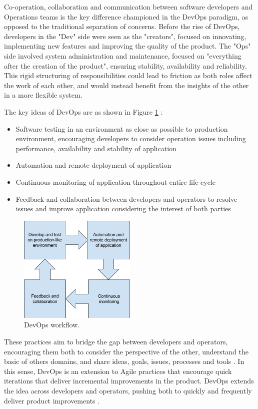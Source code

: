Co-operation, collaboration and communication between software developers and Operations teams is the key difference championed in the DevOps paradigm, as opposed to the traditional separation of concerns. Before the rise of DevOps, developers in the "Dev" side were seen as the "creators", focused on innovating, implementing new features and improving the quality of the product. The "Ops" side involved system administration and maintenance, focused on "everything after the creation of the product", ensuring stability, availability and reliability. This rigid structuring of responsibilities could lead to friction as both roles affect the work of each other, and would instead benefit from the insights of the other in a more flexible system. 

The key ideas of DevOps are as shown in Figure \ref{fig:devops} \cite{d}:
\begin{itemize}
\item Software testing in an environment as close as possible to production environment, encouraging developers to consider operation issues including performance, availability and stability of application
\item Automation and remote deployment of application
\item Continuous monitoring of application throughout entire life-cycle
\item Feedback and collaboration between developers and operators to resolve issues and improve application considering the interest of both parties
\end{itemize}
\begin{figure}[h]
\centering
\caption{DevOps workflow.}
\label{fig:devops}
\includegraphics[width=0.5\textwidth]{images/devops.png}
\end{figure}
These practices aim to bridge the gap between developers and operators, encouraging them both to consider the perspective of the other, understand the basic of others domains, and share ideas, goals, issues, processes and tools \cite{e}. In this sense, DevOps is an extension to Agile practices that encourage quick iterations that deliver incremental improvements in the product. DevOps extends the idea across developers and operators, pushing both to quickly and frequently deliver product improvements \cite{e}. 

